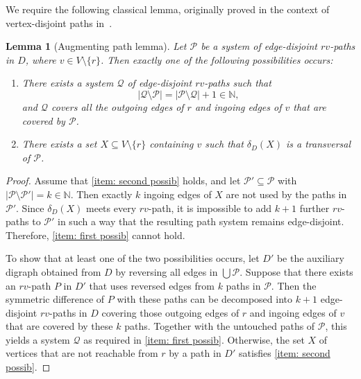 \documentclass[12pt,a4paper]{amsart}
\theoremstyle{plain}
\newtheorem{lemma}[theorem]{Lemma}
\theoremstyle{definition}
\begin{document}
We require the following classical lemma, originally proved in the context of vertex-disjoint paths in~\cite{bohme2001menger}.

\begin{lemma}[Augmenting path lemma]\label{lem: Augmenting path lemma}
Let $\mathcal{P}$ be a system of edge-disjoint $rv$-paths in $D$, where $v\in V\setminus\{r\}$.
Then exactly one of the following possibilities occurs:
\begin{enumerate}[label=(\roman*)]
 \item\label{item: first possib}
 There exists a system $\mathcal{Q}$ of edge-disjoint $rv$-paths such that
 \[
 \lvert \mathcal{Q}\setminus\mathcal{P}\rvert
 =
 \lvert \mathcal{P}\setminus\mathcal{Q}\rvert + 1 \in \mathbb{N},
 \]
 and $\mathcal{Q}$ covers all the outgoing edges of $r$ and ingoing edges of $v$ that are covered by $\mathcal{P}$.
 \item\label{item: second possib}
 There exists a set $X\subseteq V\setminus\{r\}$ containing $v$ such that $\delta_D(X)$ is a transversal of $\mathcal{P}$.
\end{enumerate}
\end{lemma}

\begin{proof}
Assume that \ref{item: second possib} holds, and let $\mathcal{P}'\subseteq\mathcal{P}$ with
$\lvert \mathcal{P}\setminus\mathcal{P}'\rvert = k \in \mathbb{N}$.
Then exactly  $k$ ingoing edges of $X$  are not used by the paths in $\mathcal{P}'$.
Since $\delta_D(X)$ meets every $rv$-path, it is impossible to add $k+1$ further $rv$-paths to $\mathcal{P}'$ in such a way that the resulting path 
system remains edge-disjoint.
Therefore, \ref{item: first possib} cannot hold.

To show that at least one of the two possibilities occurs, let $D'$ be the auxiliary digraph obtained from $D$ by reversing all edges in 
$\bigcup\mathcal{P}$.
Suppose that there exists an $rv$-path $P$ in $D'$ that uses reversed edges from $k$ paths in $\mathcal{P}$. Then the symmetric difference of $P$ 
with these 
paths can be decomposed into $k+1$ edge-disjoint $rv$-paths in $D$ covering those outgoing edges of $r$ and ingoing edges of $v$ that are 
covered by these $k$ paths.
Together with the untouched paths of $\mathcal{P}$, this yields a system $\mathcal{Q}$ as required in \ref{item: first possib}.
Otherwise, the set $X$ of vertices that are not reachable from $r$ by a path in $D'$ satisfies \ref{item: second possib}.
\end{proof}
\end{document}

